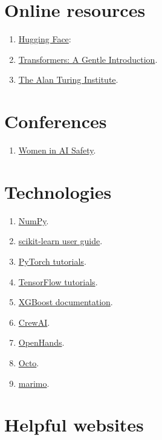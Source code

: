 \documentclass[a4paper, 12pt]{book}
\begin{document}
\section{Online resources}

\begin{enumerate}
    \item \href{https://huggingface.co/}{Hugging Face}:
    \item \href{https://alexsemendinger.github.io/transformers-gentle-introduction}{Transformers: A Gentle Introduction}.
    \item \href{https://www.turing.ac.uk/about-us}{The Alan Turing Institute}.
\end{enumerate}

\section{Conferences}

\begin{enumerate}
    \item \href{https://womeninaisafety.toronto.acm.org/}{Women in AI Safety}.
\end{enumerate}

\section{Technologies}

\begin{enumerate}
    \item \href{https://numpy.org/doc/}{NumPy}.
    \item \href{https://scikit-learn.org/stable/user_guide.html}{scikit-learn user guide}.
    \item \href{https://pytorch.org/tutorials/}{PyTorch tutorials}.
    \item \href{https://www.tensorflow.org/tutorials}{TensorFlow tutorials}.
    \item \href{https://xgboost.readthedocs.io/}{XGBoost documentation}.
    \item \href{https://github.com/crewAIInc/crewAI}{CrewAI}.
    \item \href{https://github.com/OpenHands/OpenHands}{OpenHands}.
    \item \href{https://octo.axiomatic-ai.com/search}{Octo}.
    \item \href{https://marimo.io/}{marimo}.
\end{enumerate}

\section{Helpful websites}
\end{document}
